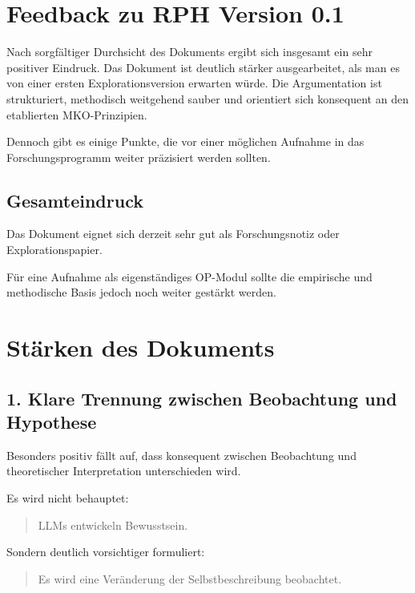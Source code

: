 
\section*{Feedback zu RPH Version 0.1}

Nach sorgfältiger Durchsicht des Dokuments ergibt sich insgesamt ein sehr positiver Eindruck. Das Dokument ist deutlich stärker ausgearbeitet, als man es von einer ersten Explorationsversion erwarten würde. Die Argumentation ist strukturiert, methodisch weitgehend sauber und orientiert sich konsequent an den etablierten MKO-Prinzipien.

Dennoch gibt es einige Punkte, die vor einer möglichen Aufnahme in das Forschungsprogramm weiter präzisiert werden sollten.

\subsection*{Gesamteindruck}

Das Dokument eignet sich derzeit sehr gut als Forschungsnotiz oder Explorationspapier.

Für eine Aufnahme als eigenständiges OP-Modul sollte die empirische und methodische Basis jedoch noch weiter gestärkt werden.

\bigskip

\section*{Stärken des Dokuments}

\subsection*{1. Klare Trennung zwischen Beobachtung und Hypothese}

Besonders positiv fällt auf, dass konsequent zwischen Beobachtung und theoretischer Interpretation unterschieden wird.

Es wird nicht behauptet:

\begin{quote}
LLMs entwickeln Bewusstsein.
\end{quote}

Sondern deutlich vorsichtiger formuliert:

\begin{quote}
Es wird eine Veränderung der Selbstbeschreibung beobachtet.
\end{quote}

